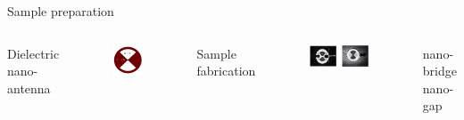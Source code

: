 \documentclass[xcolor = {dvipsnames}]{beamer}
\begin{document}
\begin{frame}{Sample preparation}
\begin{columns}
\centering
Dielectric nano-antenna
\begin{figure}[h!]
\centering
\includegraphics[width=1\textwidth]{images/antenna}
\end{figure}
\pause
\centering
Sample fabrication
\begin{figure}[h!]
\centering
\includegraphics[width=1\textwidth]{images/compare}
\end{figure}
\centering
\hspace{-1cm}nano-bridge \qquad nano-gap
\end{columns}
\end{frame}
\end{document}
